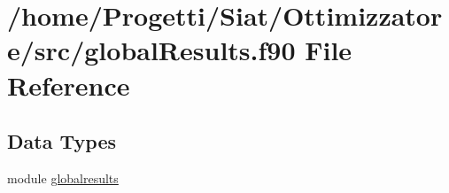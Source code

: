 \hypertarget{global_results_8f90}{\section{/home/\-Progetti/\-Siat/\-Ottimizzatore/src/global\-Results.f90 File Reference}
\label{global_results_8f90}
}
\subsection*{Data Types}
\begin{DoxyCompactItemize}
\item 
module \hyperlink{classglobalresults}{globalresults}
\end{DoxyCompactItemize}
